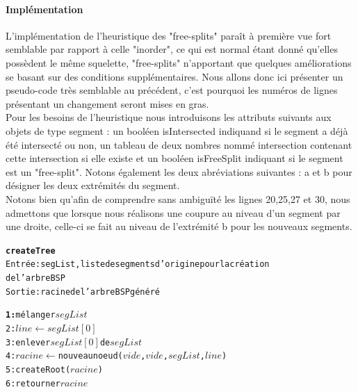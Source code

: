 \documentclass[11pt,a4paper]{article}
\begin{document}
\paragraph{Implémentation}

L'implémentation de l'heuristique des "free-splits" paraît à première vue fort semblable par rapport à celle "inorder", ce qui est normal étant donné qu'elles possèdent le même squelette, "free-splits" n'apportant que quelques améliorations se basant sur des conditions supplémentaires. Nous allons donc ici présenter un pseudo-code très semblable au précédent, c'est pourquoi les numéros de lignes présentant un changement seront mises en gras.\\

Pour les besoins de l'heuristique nous introduisons les attributs suivants aux objets de type segment : un booléen isIntersected indiquand si le segment a déjà été intersecté ou non, un tableau de deux nombres nommé intersection contenant cette intersection si elle existe et un booléen isFreeSplit indiquant si le segment est un "free-split". Notons également les deux abréviations suivantes : a et b pour désigner les deux extrémités du segment.\\

Notons bien qu'afin de comprendre sans ambiguïté les lignes 20,25,27 et 30, nous admettons que lorsque nous réalisons une coupure au niveau d'un segment par une droite, celle-ci se fait au niveau de l'extrémité b pour les nouveaux segments. 

\begin{alltt}
\textbf{createTree}
Entrée : segList, liste de segments d'origine pour la création 
de l'arbre BSP
Sortie : racine de l'arbre BSP généré

\textbf{1:} mélanger \(segList\)
2: \(line \leftarrow segList[0]\)
3: enlever \(segList[0]\) de \(segList\)
4: \(racine\) \(\leftarrow\) nouveau noeud (\(vide\), \(vide\), \(segList\), \(line\))
5: createRoot(\(racine\))
6: retourner \(racine\)
\end{alltt} 
\end{document}
